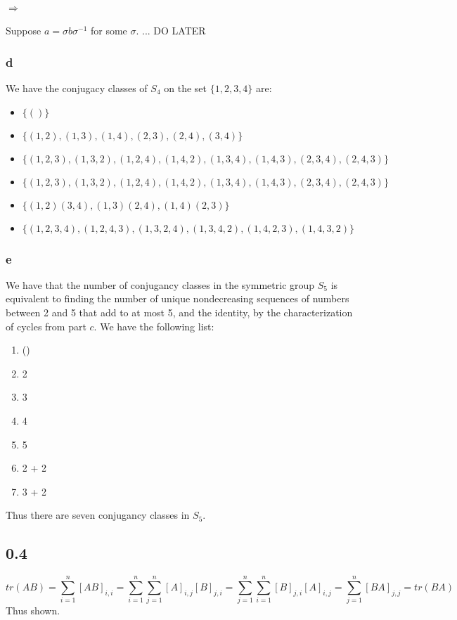 \documentclass[]{article}
\begin{document}
\paragraph{$\Rightarrow$}
Suppose $a = \sigma b \sigma^{-1}$ for some $\sigma$. ... DO LATER

\subsubsection*{d}
We have the conjugacy classes of $S_4$ on the set $\lbrace 1, 2, 3, 4 \rbrace$ are: 
\begin{itemize}
	\item $\lbrace () \rbrace$
	\item $\lbrace (1, 2), (1, 3), (1, 4), (2, 3), (2, 4), (3, 4) \rbrace$
	\item $\lbrace (1, 2, 3) , (1,3, 2), (1,2, 4), (1, 4, 2), (1, 3, 4), (1, 4, 3), (2, 3, 4), (2, 4, 3) \rbrace$
	\item $\lbrace (1, 2, 3) , (1,3, 2), (1,2, 4), (1, 4, 2), (1, 3, 4), (1, 4, 3), (2, 3, 4), (2, 4, 3) \rbrace$
	\item $\lbrace (1,2)(3, 4), (1, 3)(2, 4), (1,4)(2,3) \rbrace$
	\item $\lbrace(1, 2, 3, 4), (1, 2, 4, 3), (1, 3, 2, 4), (1, 3, 4, 2), (1, 4, 2, 3), (1, 4, 3, 2) \rbrace$
\end{itemize}

\subsubsection*{e}
We have that the number of conjugancy classes in the symmetric group $S_5$ is equivalent to finding the number of unique nondecreasing sequences of numbers between 2 and 5 that add to at most 5, and the identity, by the characterization of cycles from part $c$.
We have the following list:
\begin{enumerate}
	\item ()
	\item 2
	\item 3
	\item 4
	\item 5
	\item 2 + 2
	\item 3 + 2
\end{enumerate}
Thus there are seven conjugancy classes in $S_5$.

\subsection*{0.4}
\begin{equation*}
tr(AB) = \sum_{i = 1}^n [AB]_{i,i} = \sum_{i = 1}^n \sum_{j = 1}^n [A]_{i,j} [B]_{j, i } = \sum_{j = 1}^n\sum_{i = 1}^n  [B]_{j, i }[A]_{i,j}   = \sum_{j = 1}^n [BA]_{j,j} = tr(BA)
\end{equation*}
Thus shown. 
\end{document}
